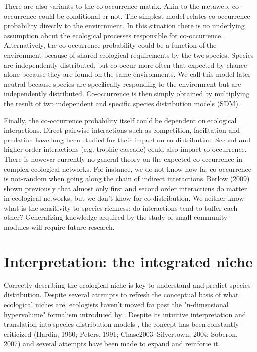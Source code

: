 \documentclass[12pt]{article}
\begin{document}
There are also variants to the co-occurrence matrix. Akin to the metaweb,
co-occurrence could be conditional or not. The simplest model relates
co-occurrence probability directly to the environment. In this situation there
is no underlying assumption about the ecological processes responsible for
co-occurrence. Alternatively, the co-occurrence probability could be a function
of the environment because of shared ecological requirements by the two species.
Species are independently distributed, but co-occur more often that expected by
chance alone because they are found on the same environments. We call this model
later neutral because species are specifically responding to the environment but
are independently distributed. Co-occurrence is then simply obtained by
multiplying the result of two independent and specific species distribution
models (SDM).

Finally, the co-occurrence probability itself could be dependent on ecological
interactions. Direct pairwise interactions such as competition, facilitation and
predation have long been studied for their impact on co-distribution. Second and
higher order interactions (e.g. trophic cascade) could also impact
co-occurrence. There is however currently no general theory on the expected
co-occurrence in complex ecological networks. For instance, we do not know how
far co-occurrence is not-random when going along the chain of indirect
interactions. Berlow (2009) shown previously that almost only first and second
order interactions do matter in ecological networks, but we don't know for
co-distribution. We neither know what is the sensitivity to species richness: do
interactions tend to buffer each other? Generalizing knowledge acquired by the
study of small community modules will require future research.

\newpage
\section*{Interpretation: the integrated niche}

Correctly describing the ecological niche is key to understand and predict
species distribution. Despite several attempts to refresh the conceptual
basis of what ecological niches are, ecologists haven't moved far past the
"n-dimensional hypervolume" formalism \parencite{Holt2009} introduced by
\textcite{Hutchinson1961}. Despite its intuitive interpretation and translation
into species distribution models \parencite{Blonder2014}, the concept has been
constantly criticized (Hardin, 1960; Peters, 1991; Chase2003; Silvertown, 2004;
Soberon, 2007) and several attempts have been made to expand and reinforce it.
\end{document}
